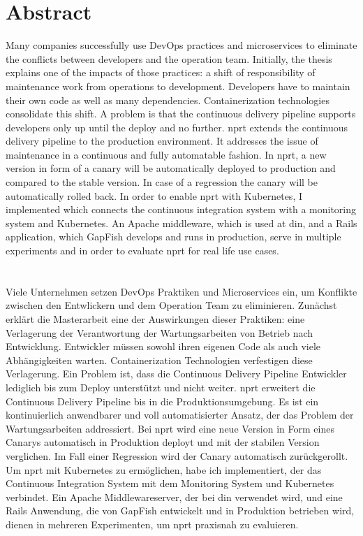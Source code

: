 \section*{Abstract}
Many companies successfully use DevOps practices and microservices to eliminate the
conflicts between developers and the operation team. Initially, the thesis explains one of
the impacts of those practices: a shift of responsibility of maintenance work from
operations to development. Developers have to maintain their own code as well as many
dependencies. Containerization technologies consolidate this shift. A problem is that the
continuous delivery pipeline supports developers only up until the deploy and no
further. \gls{nprt} extends the continuous delivery pipeline to the production
environment. It addresses the issue of maintenance in a continuous and fully automatable
fashion. In \gls{nprt}, a new version in form of a canary will be automatically deployed
to production and compared to the stable version. In case of a regression the canary will
be automatically rolled back. In order to enable \gls{nprt} with Kubernetes, I implemented
\deployer which connects the continuous integration system with a monitoring system and
Kubernetes. An Apache middleware, which is used at \gls{din}, and a Rails application,
which GapFish develops and runs in production, serve in multiple experiments and in order
to evaluate \gls{nprt} for real life use cases.
\\\\\\
Viele Unternehmen setzen DevOps Praktiken und Microservices ein, um Konflikte zwischen den
Entwlickern und dem Operation Team zu eliminieren. Zunächst erklärt die Masterarbeit eine
der Auswirkungen dieser Praktiken: eine Verlagerung der Verantwortung der Wartungsarbeiten
von Betrieb nach Entwicklung. Entwickler müssen sowohl ihren eigenen Code als auch viele
Abhängigkeiten warten. Containerization Technologien verfestigen diese Verlagerung. Ein
Problem ist, dass die Continuous Delivery Pipeline Entwickler lediglich bis zum Deploy
unterstützt und nicht weiter. \gls{nprt} erweitert die Continuous Delivery Pipeline bis in
die Produktionsumgebung. Es ist ein kontinuierlich anwendbarer und voll automatisierter
Ansatz, der das Problem der Wartungsarbeiten addressiert. Bei \gls{nprt} wird eine neue
Version in Form eines Canarys automatisch in Produktion deployt und mit der stabilen
Version verglichen. Im Fall einer Regression wird der Canary automatisch zurückgerollt. Um
\gls{nprt} mit Kubernetes zu ermöglichen, habe ich \deployer implementiert, der das
Continuous Integration System mit dem Monitoring System und Kubernetes verbindet. Ein
Apache Middlewareserver, der bei \gls{din} verwendet wird, und eine Rails Anwendung, die
von GapFish entwickelt und in Produktion betrieben wird, dienen in mehreren Experimenten,
um \gls{nprt} praxisnah zu evaluieren.

